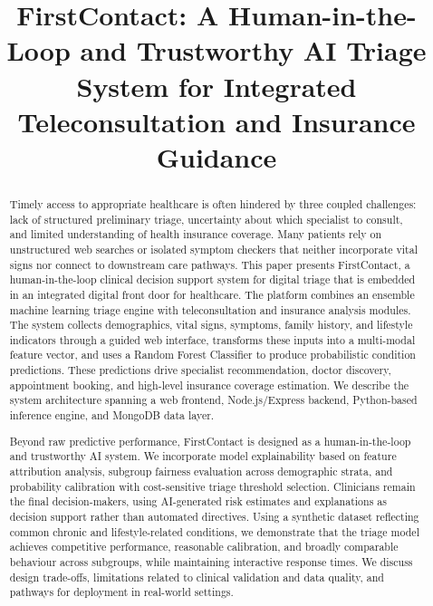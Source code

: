 \documentclass[conference]{IEEEtran}
\begin{document}
\title{FirstContact: A Human-in-the-Loop and Trustworthy AI Triage System for Integrated Teleconsultation and Insurance Guidance}

\author{
}

\maketitle

\begin{abstract}
Timely access to appropriate healthcare is often hindered by three coupled challenges: lack of structured preliminary triage, uncertainty about which specialist to consult, and limited understanding of health insurance coverage. Many patients rely on unstructured web searches or isolated symptom checkers that neither incorporate vital signs nor connect to downstream care pathways. This paper presents FirstContact, a human-in-the-loop clinical decision support system for digital triage that is embedded in an integrated digital front door for healthcare. The platform combines an ensemble machine learning triage engine with teleconsultation and insurance analysis modules. The system collects demographics, vital signs, symptoms, family history, and lifestyle indicators through a guided web interface, transforms these inputs into a multi-modal feature vector, and uses a Random Forest Classifier to produce probabilistic condition predictions. These predictions drive specialist recommendation, doctor discovery, appointment booking, and high-level insurance coverage estimation. We describe the system architecture spanning a web frontend, Node.js/Express backend, Python-based inference engine, and MongoDB data layer.

Beyond raw predictive performance, FirstContact is designed as a human-in-the-loop and trustworthy AI system. We incorporate model explainability based on feature attribution analysis, subgroup fairness evaluation across demographic strata, and probability calibration with cost-sensitive triage threshold selection. Clinicians remain the final decision-makers, using AI-generated risk estimates and explanations as decision support rather than automated directives. Using a synthetic dataset reflecting common chronic and lifestyle-related conditions, we demonstrate that the triage model achieves competitive performance, reasonable calibration, and broadly comparable behaviour across subgroups, while maintaining interactive response times. We discuss design trade-offs, limitations related to clinical validation and data quality, and pathways for deployment in real-world settings.
\end{abstract}
\end{document}
